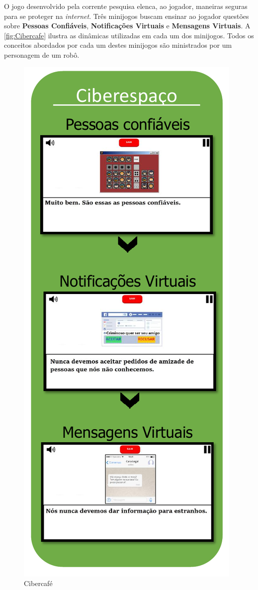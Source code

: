 O jogo desenvolvido pela corrente pesquisa elenca, ao jogador, maneiras seguras para se proteger na \textit{internet}. Três minijogos buscam ensinar ao jogador questões sobre \textbf{Pessoas Confiáveis}, \textbf{Notificações Virtuais} e \textbf{Mensagens Virtuais}. A \autoref{fig:Cibercafe} ilustra as dinâmicas utilizadas em cada um dos minijogos. Todos os conceitos abordados por cada um destes minijogos são ministrados por um personagem de um robô. 

\begin{figure}%
  \vspace{-20pt}
  \caption{\label{fig:Cibercafe}Cibercafé}
  \includegraphics[width=\linewidth]{./Visuais/Cibercafe.pdf}

\end{figure}
